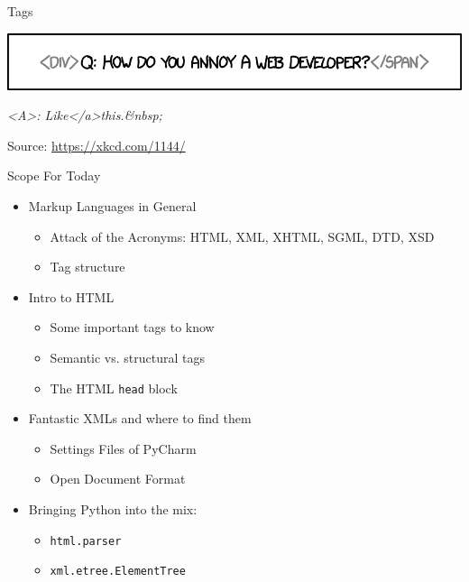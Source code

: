 \newcommand{\rx}[1]{\texttt{"{\color{olive}#1}"}}
\newcommand{\match}[1]{{\color{blue}#1}}
\newcommand{\qtt}[1]{\texttt{"{#1}"}}


\begin{frame}[t,plain]
\titlepage
\end{frame}


\begin{frame}[fragile]{Tags}
%
\begin{center}
\includegraphics[width=.9\linewidth]{./gfx/22-xkcd-tags}

\emph{\phantom{.}<A>: Like</a>this.\&nbsp;}

\vspace{6pt}
Source: \url{https://xkcd.com/1144/}
\end{center}
%
\end{frame}


\begin{frame}{Scope For Today}
%
\begin{itemize}
\item Markup Languages in General
	\begin{itemize}
	\item Attack of the Acronyms: HTML, XML, XHTML, SGML, DTD, XSD
	\item Tag structure
	\end{itemize}
\item Intro to HTML
	\begin{itemize}
	\item Some important tags to know
	\item Semantic vs. structural tags
	\item The HTML \texttt{head} block
	\end{itemize}
\item Fantastic XMLs and where to find them
	\begin{itemize}
	\item Settings Files of PyCharm
	\item Open Document Format
	\end{itemize}
\item Bringing Python into the mix: 
	\begin{itemize}
	\item \texttt{html.parser}
	\item \texttt{xml.etree.ElementTree}
	\end{itemize}
\end{itemize}
%
\end{frame}


